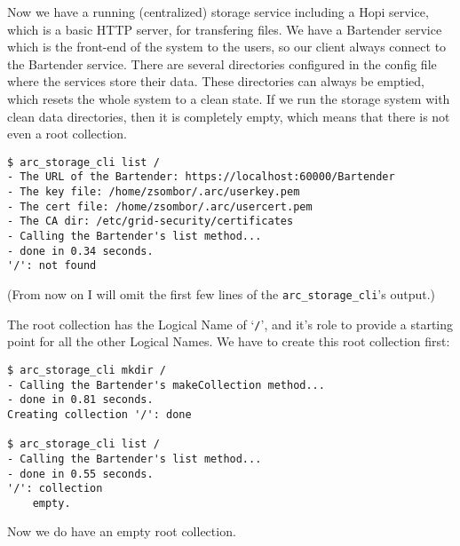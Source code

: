 \documentclass{book}
\begin{document}
Now we have a running (centralized) storage service including a Hopi service, which is a basic HTTP server, for transfering files. We have a Bartender service which is the front-end of the system to the users, so our client always connect to the Bartender service. There are several directories configured in the config file where the services store their data. These directories can always be emptied, which resets the whole system to a clean state. If we run the storage system with clean data directories, then it is completely empty, which means that there is not even a root collection.

\begin{verbatim}
$ arc_storage_cli list /
- The URL of the Bartender: https://localhost:60000/Bartender
- The key file: /home/zsombor/.arc/userkey.pem
- The cert file: /home/zsombor/.arc/usercert.pem
- The CA dir: /etc/grid-security/certificates
- Calling the Bartender's list method...
- done in 0.34 seconds.
'/': not found
\end{verbatim}

(From now on I will omit the first few lines of the \verb!arc_storage_cli!'s output.)

The root collection has the Logical Name of `\verb!/!', and it's role to provide a starting point for all the other Logical Names. We have to create this root collection first:

\begin{verbatim}
$ arc_storage_cli mkdir /
- Calling the Bartender's makeCollection method...
- done in 0.81 seconds.
Creating collection '/': done

$ arc_storage_cli list /
- Calling the Bartender's list method...
- done in 0.55 seconds.
'/': collection
    empty.
\end{verbatim}

Now we do have an empty root collection.


% 
% 
% 
% 
% 
\end{document}
